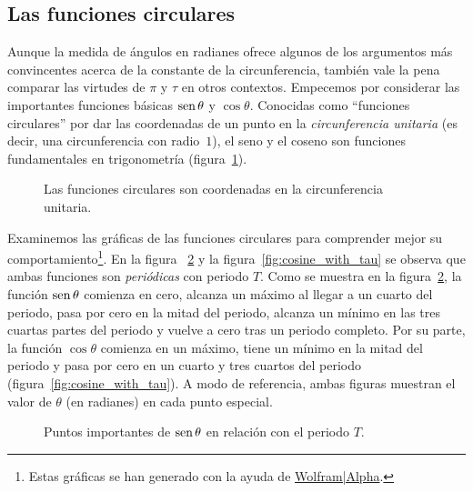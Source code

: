   \subsection{Las funciones circulares} %
  \label{sec:the_circle_functions}

Aunque la medida de ángulos en radianes ofrece algunos de los argumentos más convincentes acerca de la constante de la circunferencia, también vale la pena comparar las virtudes de $\pi$ y $\tau$ en otros contextos. Empecemos por considerar las importantes funciones básicas $\mbox{sen}\,\theta$ y $\cos\theta$. Conocidas como ``funciones circulares'' por dar las coordenadas de un punto en la \emph{circunferencia unitaria} (es decir, una circunferencia con radio~$1$), el seno y el coseno son funciones fundamentales en trigonometría (figura~\ref{fig:circle_functions}).

\begin{figure}
\begin{center}
\end{center}
\caption{Las funciones circulares son coordenadas en la circunferencia unitaria.\label{fig:circle_functions}}
\end{figure}

Examinemos las gráficas de las funciones circulares para comprender mejor su comportamiento\footnote{Estas gráficas se han generado con la ayuda de \href{http://www.wolframalpha.com/}{Wolfram|Alpha}.}. En la figura ~\ref{fig:sine_with_tau} y la figura~\ref{fig:cosine_with_tau} se observa que ambas funciones son \emph{periódicas} con periodo $T$. Como se muestra en la figura~\ref{fig:sine_with_tau}, la función $\mbox{sen}\,\theta$ comienza en cero, alcanza un máximo al llegar a un cuarto del periodo, pasa por cero en la mitad del periodo, alcanza un mínimo en las tres cuartas partes del periodo y vuelve a cero tras un periodo completo. Por su parte, la función $\cos\theta$ comienza en un máximo, tiene un mínimo en la mitad del periodo y pasa por cero en un cuarto y tres cuartos del periodo (figura~\ref{fig:cosine_with_tau}). A modo de referencia, ambas figuras muestran el valor de $\theta$ (en radianes) en cada punto especial.

\begin{figure}
\begin{center}
\end{center}
\caption{Puntos importantes de $\mbox{sen}\,\theta$ en relación con el periodo $T$.\label{fig:sine_with_tau}}
\end{figure}

